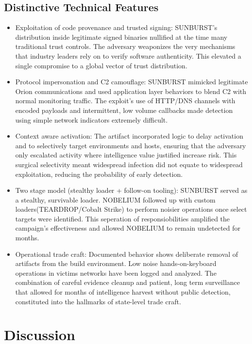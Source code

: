 \documentclass[conference]{IEEEtran}
\begin{document}
\subsection{Distinctive Technical Features}
\begin{itemize}
    \item Exploitation of code provenance and trusted signing: SUNBURST's distribution inside legitimate signed binaries nullified at the time many traditional
    trust controls. The adversary weaponizes the very mechanisms that industry leaders rely on to verify software authenticity. This elevated a single compromise to a global vector of trust distribution.
    \item Protocol impersonation and C2 camouflage: SUNBURST mimicked legitimate Orion communications and used application layer behaviors to blend  C2 with normal monitoring traffic.
    The exploit's use of HTTP/DNS channels with encoded payloads and intermittent, low volume callbacks made detection using simple network indicators extremely difficult.
    \item Context aware activation: The artifact incorporated logic to delay activation and to selectively target environments and hosts, ensuring that the adversary only escalated activity
    where intelligence value justified increase risk. This surgical selectivity meant widespread infection did not equate to widespread exploitation, reducing the probability of early detection.
    \item Two stage model (stealthy loader + follow-on tooling): SUNBURST served as a stealthy, survivable loader. NOBELIUM followed up with custom
    loaders(TEARDROP/Cobalt Strike) to perform noisier operations once select targets were identified\cite{MicrosoftDeepDiveSOLORIGATE}. This seperation
    of responsiobilities amplified the campaign's effectiveness and allowed NOBELIUM to remain undetected for months.
    \item Operational trade craft: Documented behavior shows deliberate removal of artifacts from the build environment. Low noise hands-on-keyboard 
    operations in victims networks have been logged and analyzed. The combination of careful evidence cleanup and patient, long term
    surveillance that allowed for months of intelligence harvest without public detection, constituted into the hallmarks of state-level trade craft. 
\end{itemize}




\section*{Discussion}
\end{document}
